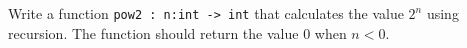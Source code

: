 Write a function \lstinline{pow2 : n:int -> int} that calculates the value $2^n$ using recursion. The function should return the value $0$ when $n<0$.
